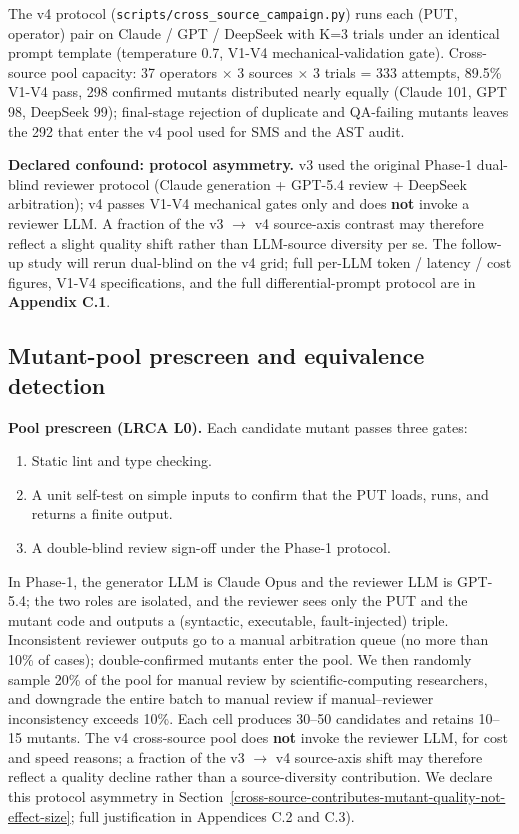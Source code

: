 \documentclass[12pt]{article}
\providecommand{\tightlist}{\setlength{\itemsep}{0pt}\setlength{\parskip}{0pt}}
\begin{document}
The v4 protocol (\texttt{scripts/cross\_source\_campaign.py}) runs each
(PUT, operator) pair on Claude / GPT / DeepSeek with K=3 trials under an
identical prompt template (temperature 0.7, V1-V4 mechanical-validation
gate). Cross-source pool capacity: 37 operators $\times$ 3 sources $\times$ 3 trials =
333 attempts, 89.5\% V1-V4 pass, 298 confirmed mutants distributed nearly
equally (Claude 101, GPT 98, DeepSeek 99); final-stage rejection of
duplicate and QA-failing mutants leaves the 292 that enter the v4 pool
used for SMS and the AST audit.

\textbf{Declared confound: protocol asymmetry.} v3 used the
original Phase-1 dual-blind reviewer protocol (Claude generation +
GPT-5.4 review + DeepSeek arbitration); v4 passes V1-V4 mechanical gates
only and does \textbf{not} invoke a reviewer LLM. A fraction of the v3 $\to$
v4 source-axis contrast may therefore reflect a slight quality shift
rather than LLM-source diversity per se. The follow-up study will rerun
dual-blind on the v4 grid; full per-LLM token / latency / cost figures,
V1-V4 specifications, and the full differential-prompt protocol are in
\textbf{Appendix C.1}.

\subsection{Mutant-pool prescreen and equivalence detection}\label{mutant-pool-prescreen-and-equivalence-detection}

\textbf{Pool prescreen (LRCA L0).} Each candidate mutant passes three
gates:
\begin{enumerate}
\tightlist
\item Static lint and type checking.
\item A unit self-test on simple inputs to confirm that the PUT loads,
  runs, and returns a finite output.
\item A double-blind review sign-off under the Phase-1 protocol.
\end{enumerate} In Phase-1, the generator LLM is Claude Opus and the reviewer
LLM is GPT-5.4; the two roles are isolated, and the reviewer sees only
the PUT and the mutant code and outputs a (syntactic, executable,
fault-injected) triple. Inconsistent reviewer outputs go to a manual
arbitration queue (no more than 10\% of cases); double-confirmed mutants
enter the pool. We then randomly sample 20\% of the pool for manual
review by scientific-computing researchers, and downgrade the entire
batch to manual review if manual--reviewer inconsistency exceeds 10\%.
Each cell produces 30--50 candidates and retains 10--15 mutants. The v4
cross-source pool does \textbf{not} invoke the reviewer LLM, for cost
and speed reasons; a fraction of the v3 $\to$ v4 source-axis shift may
therefore reflect a quality decline rather than a source-diversity
contribution. We declare this protocol asymmetry in Section~\ref{cross-source-contributes-mutant-quality-not-effect-size};
full justification in Appendices C.2 and C.3).
\end{document}
